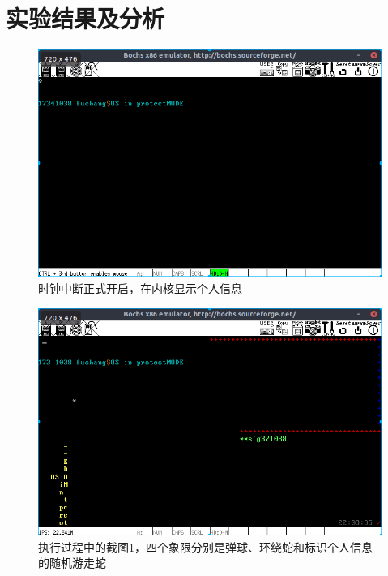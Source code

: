 \documentclass[a4paper,11pt,UTF8]{ctexart}
\newcommand{\bottomcaption}{%
\setlength{\abovecaptionskip}{6pt}%
\setlength{\belowcaptionskip}{6pt}%
\caption}
\begin{document}
\section{实验结果及分析}
	\begin{figure}[htbp]
		\centering
		\includegraphics[width=15cm]{img/1.png}
		\bottomcaption{时钟中断正式开启，在内核显示个人信息}
	\end{figure}
	\begin{figure}[htbp]
		\centering
		\includegraphics[width=15cm]{img/2.png}
		\bottomcaption{执行过程中的截图1，四个象限分别是弹球、环绕蛇和标识个人信息的随机游走蛇}
	\end{figure}
\end{document}
